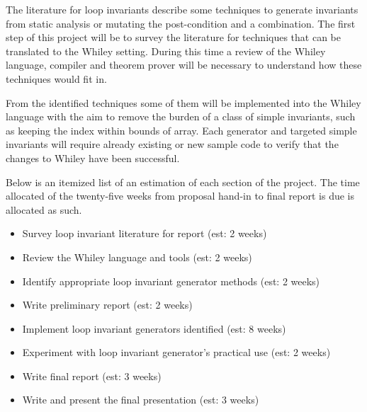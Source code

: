 \documentclass[11pt, a4paper, twoside, openright]{report}
\begin{document}
%

The literature for loop invariants describe some techniques to generate
invariants from static analysis or mutating the post-condition and a 
combination.
The first step of this project will be to survey the literature
for techniques that can be translated to the Whiley setting.
During this time a review of the Whiley language, compiler and theorem prover
will be necessary to understand how these techniques would fit in.

From the identified techniques some of them will be implemented into the
Whiley language with the aim to remove the burden of a class of simple invariants,
such as keeping the index within bounds of array.
Each generator and targeted simple invariants will require already existing
or new sample code to verify that the changes to Whiley have been successful.

Below is an itemized list of an estimation of each section of the project.
The time allocated of the twenty-five weeks from proposal hand-in to
final report is due is allocated as such. 

\begin{itemize}
    \item Survey loop invariant literature for report (est: 2 weeks) 
    \item Review the Whiley language and tools (est: 2 weeks)
    \item Identify appropriate loop invariant generator methods (est: 2 weeks)
    \item Write preliminary report (est: 2 weeks)
    \item Implement loop invariant generators identified (est: 8 weeks)
    \item Experiment with loop invariant generator's practical use (est: 2 weeks)
    \item Write final report (est: 3 weeks)
    \item Write and present the final presentation (est: 3 weeks)
\end{itemize}
\end{document}
